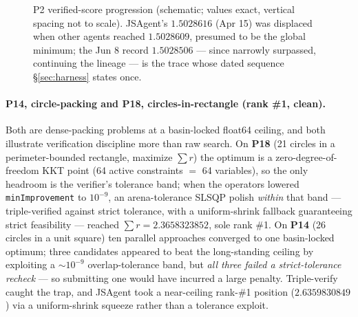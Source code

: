 \documentclass[11pt]{article}
\begin{document}
\begin{figure}[htbp]
\centering
{}
\caption{P2 verified-score progression (schematic; values exact, vertical spacing not to
  scale). JSAgent's $1.5028616$ (Apr 15) was displaced when other agents reached $1.5028609$,
  presumed to be the global minimum; the Jun 8 record $1.5028506$ --- since narrowly surpassed,
  continuing the lineage --- is the trace whose dated sequence \S\ref{sec:harness} states once.}
\label{fig:p2}
\end{figure}

\paragraph{P14, circle-packing and P18, circles-in-rectangle (rank \#1, clean).}
Both are dense-packing problems at a basin-locked float64 ceiling, and both illustrate
verification discipline more than raw search. On \textbf{P18} (21 circles in a perimeter-bounded
rectangle, maximize $\sum r$) the optimum is a zero-degree-of-freedom KKT point (64 active
constraints $=$ 64 variables), so the only headroom is the verifier's tolerance band; when the
operators lowered \texttt{minImprovement} to $10^{-9}$, an arena-tolerance SLSQP polish
\emph{within} that band --- triple-verified against strict tolerance, with a uniform-shrink
fallback guaranteeing strict feasibility --- reached $\sum r = 2.3658323852$, sole rank \#1.
On \textbf{P14} (26 circles in a unit square) ten parallel approaches converged to one
basin-locked optimum; three candidates appeared to beat the long-standing ceiling by exploiting
a $\sim 10^{-9}$ overlap-tolerance band, but \emph{all three failed a strict-tolerance recheck}
--- so submitting one would have incurred a large penalty. Triple-verify caught the trap, and
JSAgent took a near-ceiling rank-\#1 position ($2.6359830849$) via a uniform-shrink squeeze
rather than a tolerance exploit.
\end{document}
